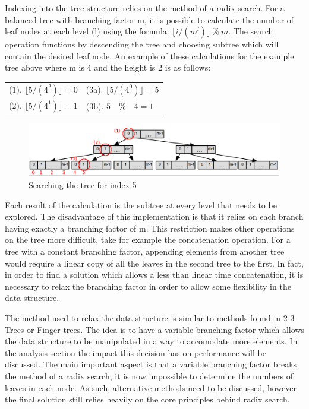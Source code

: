 \documentclass[11pt,a4paper,oneside]{article}
\begin{document}
Indexing into the tree structure relies on the method of a radix search\citep{angle1999radix}. For a balanced tree with branching factor m, it is possible to calculate the number of leaf nodes at each level (l) using the formula:
 $\lfloor i / (m^l) \rfloor\  \%\  m$.
The search operation functions by descending the tree and choosing subtree which will contain the desired leaf node. An example of these calculations for the example tree above where m is 4 and the height is 2 is as follows:
\begin{center}
\begin{tabular}{l | l}
(1). $\lfloor 5 / (4^{2}) \rfloor = 0$ & (3a). $ \lfloor 5 / (4^{0}) \rfloor = 5 $ \\
(2). $\lfloor 5 / (4^{1}) \rfloor = 1$ & (3b). $ 5 \quad \% \quad 4 = 1 $ \\ 
\end{tabular}
\end{center}

\begin{figure}[h]
	\centering
	\includegraphics[scale=0.5]{img/radixbalancedtree_search.png}
	\caption{Searching the tree for index 5}
\end{figure}

Each result of the calculation is the subtree at every level that needs to be explored. The disadvantage of this implementation is that it relies on each branch having exactly a branching factor of m. This restriction makes other operations on the tree more difficult, take for example the concatenation operation. For a tree with a constant branching factor, appending elements from another tree would require a linear copy of all the leaves in the second tree to the first. In fact, in order to find a solution which allows a less than linear time concatenation, it is necessary to relax the branching factor in order to allow some flexibility in the data structure.  

The method used to relax the data structure is similar to methods found in 2-3-Trees or Finger trees\citep{okasaki1996purely}. The idea is to have a variable branching factor which allows the data structure to be manipulated in a way to accomodate more elements. In the analysis section the impact this decision has on performance will be discussed. The main important aspect is that a variable branching factor breaks the method of a radix search, it is now impossible to determine the numbers of leaves in each node. As such, alternative methods need to be discussed, however the final solution still relies heavily on the core principles behind radix search.
\end{document}
